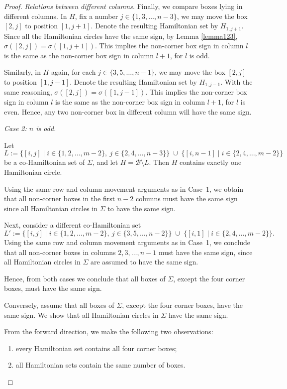 \documentclass[10pt,a4paper]{amsart}
\begin{document}
\begin{proof}
\medskip
\noindent\emph{Relations between different columns.}
Finally, we compare boxes lying in different columns.
In $H$, fix a number $j\in\{1,3,\dots,n-3\}$, we may move the box $[2,j]$
to position $[1,j+1]$. Denote the resulting Hamiltonian set by $H_{1,j+1}$. Since all the Hamiltonian circles have the same sign, 
by Lemma \ref{lemma123}, $\sigma([2,j])=\sigma([1,j+1])$. This implies the non-corner box sign in column $l$ is the same as the non-corner box sign in column $l+1$, for $l$ is odd.

Similarly, in $H$ again,  for each $j\in\{3,5,\dots,n-1\}$, we may move the box $[2,j]$
to position $[1,j-1]$. Denote the resulting Hamiltonian set by $H_{1,j-1}$.
With the same reasoning, $\sigma([2,j])=\sigma([1,j-1])$.  This implies the non-corner box sign in column $l$ is the same as the non-corner box sign in column $l+1$, for $l$ is even.
Hence, any two non-corner box in different column will have the same sign. 




\medskip
\noindent\emph{Case 2: $n$ is odd.}

Let
\[
L:=\{[i,j]\mid i\in \{1,2,\dots,m-2\},\ j\in \{2,4,\dots,n-3\}\}
\;\cup\;
\{[i,n-1]\mid i\in \{2,4,\dots,m-2\}\}
\]
be a co-Hamiltonian set of $\Sigma$, and let $H=\mathcal{B}\setminus L$.
Then $H$ contains exactly one Hamiltonian circle.

Using the same row and column movement arguments as in Case~1,
we obtain that all non-corner boxes in the first $n-2$ columns
must have the same sign since all Hamiltonian circles in $\Sigma$
to have the same sign.

Next, consider a different co-Hamiltonian set
\[
L':=\{[i,j]\mid i\in \{1,2,\dots,m-2\},\ j\in \{3,5,\dots,n-2\}\}
\;\cup\;
\{[i,1]\mid i\in \{2,4,\dots,m-2\}\}.
\]
Using the same row and column movement arguments as in Case~1,
we conclude that all non-corner boxes in columns $2,3,\dots,n-1$
must have the same sign, since all Hamiltonian circles in $\Sigma$
are assumed to have the same sign.

Hence, from both cases we conclude that all boxes of $\Sigma$, except the four corner boxes, must have the same sign.




Conversely, assume that all boxes of $\Sigma$, except the four corner boxes, have the same sign.
We show that all Hamiltonian circles in $\Sigma$ have the same sign.

From the forward direction, we make the following two observations:
\begin{enumerate}
\item every Hamiltonian set contains all four corner boxes;
\item all Hamiltonian sets contain the same number of boxes.
\end{enumerate}


\end{proof}
\end{document}
